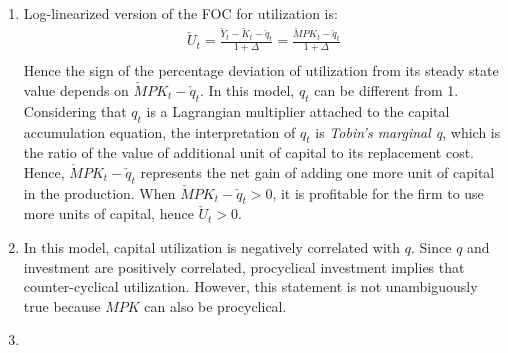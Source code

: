 \documentclass[11pt]{amsart}
\begin{document}
\begin{enumerate}[label = (\alph*)]
	\item Log-linearized version of the FOC for utilization is:
	\begin{align*}
	\check U_t = \frac{\check Y_t  - \check K_t - \check q_t}{1 + \Delta} = \frac{\check MPK_t - \check q_t}{1 + \Delta} \\
	\end{align*}
	Hence the sign of the percentage deviation of utilization from its steady state value depends on $\check MPK_t - \check q_t$. In this model, $q_t$ can be different from 1. Considering that $q_t$ is a Lagrangian multiplier attached to the capital accumulation equation, the interpretation of $q_t$ is \textit{Tobin's marginal q}, which is the ratio of the value of additional unit of capital to its replacement cost. Hence, $\check MPK_t - \check q_t$ represents the net gain of adding one more unit of capital in the production. When $\check MPK_t - \check q_t > 0$, it is profitable for the firm to use more units of capital, hence $\check U_t >0$. 
	
	\item In this model, capital utilization is negatively correlated with $q$. Since $q$ and investment are positively correlated, procyclical investment implies that counter-cyclical utilization. However, this statement is not unambiguously true because $MPK$ can also be procyclical. 
	\item 
\end{enumerate}
\end{document}
